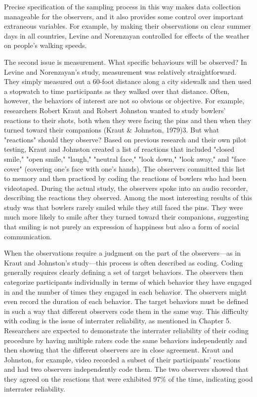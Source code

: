 Precise specification of the sampling process in this way makes data collection manageable for the observers, and it also provides some control over important extraneous variables. For example, by making their observations on clear summer days in all countries, Levine and Norenzayan controlled for effects of the weather on people's walking speeds.


The second issue is measurement. What specific behaviours will be observed? In Levine and Norenzayan's study, measurement was relatively straightforward. They simply measured out a 60-foot distance along a city sidewalk and then used a stopwatch to time participants as they walked over that distance. Often, however, the behaviors of interest are not so obvious or objective. For example, researchers Robert Kraut and Robert Johnston wanted to study bowlers' reactions to their shots, both when they were facing the pins and then when they turned toward their companions (Kraut \& Johnston, 1979)3. But what "reactions" should they observe? Based on previous research and their own pilot testing, Kraut and Johnston created a list of reactions that included "closed smile," "open smile," "laugh," "neutral face," "look down," "look away," and "face cover" (covering one's face with one's hands). The observers committed this list to memory and then practiced by coding the reactions of bowlers who had been videotaped. During the actual study, the observers spoke into an audio recorder, describing the reactions they observed. Among the most interesting results of this study was that bowlers rarely smiled while they still faced the
pins. They were much more likely to smile after they turned toward their companions, suggesting that smiling is not purely an expression of happiness but also a form of social communication.


When the observations require a judgment on the part of the observers---as in Kraut and Johnston's study---this process is often described as coding. Coding generally requires clearly defining a set of target behaviors. The observers then categorize participants individually in terms of which behavior they have engaged in and the number of times they engaged in each behavior. The observers might even record the duration of each behavior. The target behaviors must be defined in such a way that different observers code them in the same way. This difficulty with coding is the issue of interrater reliability, as mentioned in Chapter 5. Researchers are expected to demonstrate the interrater reliability of their coding procedure by having multiple raters code the same behaviors independently and then showing that the different observers are in close agreement. Kraut and Johnston, for example, video recorded a subset of their participants' reactions and had two observers independently code them. The two observers showed that they agreed on the reactions that were exhibited 97\% of the time, indicating good interrater reliability.



